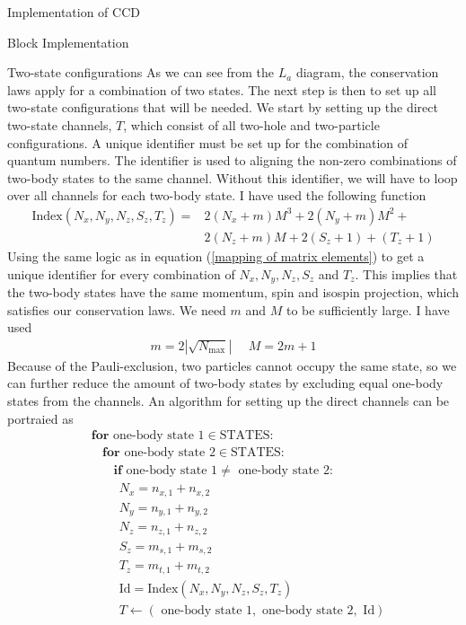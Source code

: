 \documentclass[twoside,english]{uiofysmaster}
\begin{document}
\begin{chapter}{Implementation of CCD}
\begin{section}{Block Implementation}
		\begin{subsection}{Two-state configurations}
			As we can see from the $L_a$ diagram, the conservation laws apply for a combination of two states. The next step is then to set up all two-state configurations that will be needed. We start by setting up the direct two-state channels, $T$, which consist of all two-hole and two-particle configurations. A unique identifier must be set up for the combination of quantum numbers. The identifier is used to aligning the non-zero combinations of two-body states to the same channel. Without this identifier, we will have to loop over all channels for each two-body state. I have used the following function 
			\begin{align}
				\text{Index}(N_x,N_y,N_z,S_z,T_z) = &2(N_x + m)M^3 + 2(N_y+m)M^2 + \\ & 2(N_z+m)M + 2(S_z+1) + (T_z+1)
			\end{align}
			Using the same logic as in equation (\ref{mapping of matrix elements}) to get a unique identifier for every combination of $N_x,N_y,N_z,S_z$ and $T_z$. This implies that the two-body states have the same momentum, spin and isospin projection, which satisfies our conservation laws. We need $m$ and $M$ to be sufficiently large. I have used
			\begin{align}
				m = 2|\sqrt{N_{\text{max}}}| \:\:\:\:\:\: M = 2m +1
			\end{align}
			Because of the Pauli-exclusion, two particles cannot occupy the same state, so we can further reduce the amount of two-body states by excluding equal one-body states from the channels. An algorithm for setting up the direct channels can be portraied as
			\begin{align*}
				&\mathbf{for } \text{ one-body state 1} \in \text{STATES}: \\
				&\:\:\:\: \mathbf{for } \text{ one-body state 2} \in \text{STATES}: \\
				&\:\:\:\:\:\:\:\: \mathbf{if} \text{ one-body state 1} \neq \text{ one-body state 2}: \\
				&\:\:\:\:\:\:\:\:\:\: N_x = n_{x,1} + n_{x,2} \\
				&\:\:\:\:\:\:\:\:\:\: N_y = n_{y,1} + n_{y,2} \\
				&\:\:\:\:\:\:\:\:\:\: N_z = n_{z,1} + n_{z,2} \\
 				&\:\:\:\:\:\:\:\:\:\: S_z = m_{s,1} + m_{s,2} \\
				&\:\:\:\:\:\:\:\:\:\: T_z = m_{t,1} + m_{t,2} \\
				&\:\:\:\:\:\:\:\:\:\: \text{Id} = \text{Index}(N_x,N_y,N_z,S_z,T_z) \\
				&\:\:\:\:\:\:\:\:\:\: T \leftarrow (\text{ one-body state 1}, \text{ one-body state 2}, \text{ Id})
			\end{align*}


\end{subsection}
\end{section}
\end{chapter}
\end{document}
